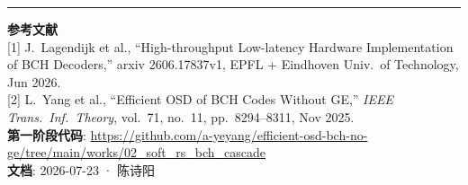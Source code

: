 \documentclass[11pt,a4paper]{article}
\begin{document}
\vspace{6pt}
\hrule
\vspace{4pt}
\noindent\footnotesize{
\textbf{参考文献}\\
{[1]} J.\ Lagendijk et al., ``High-throughput Low-latency Hardware Implementation of BCH Decoders,''
arxiv 2606.17837v1, EPFL + Eindhoven Univ.\ of Technology, Jun 2026.\\
{[2]} L.\ Yang et al., ``Efficient OSD of BCH Codes Without GE,''
{\it IEEE Trans.\ Inf.\ Theory}, vol.\ 71, no.\ 11, pp.\ 8294--8311, Nov 2025.\\
\textbf{第一阶段代码}: \url{https://github.com/a-yeyang/efficient-osd-bch-no-ge/tree/main/works/02_soft_rs_bch_cascade}\\
\textbf{文档}: 2026-07-23 · 陈诗阳
}
\end{document}
